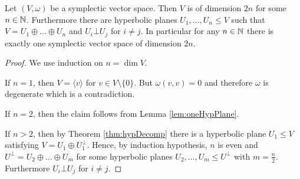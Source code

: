 \begin{corollary}\label{cor:structureSympl}
				
	Let $(V,\omega)$ be a symplectic vector space. Then $V$ is of dimension $2n$ for some $n\in\mathbb{N}$. Furthermore there are hyperbolic planes $U_1,\dots, U_n\leq V$ such that $V=U_1\oplus\dots\oplus U_n$ and $U_i\bot U_j$ for $i\not=j$.
	In particular for any $n\in\mathbb{N}$ there is exactly one symplectic vector space of dimension $2n$.
\end{corollary}
\begin{proof}
	We use induction on $n=\dim V$.
				
	If $n=1$, then $V=\langle v\rangle$ for $v\in V\setminus\{0\}$. But $\omega(v,v)=0$ and therefore $\omega$ is degenerate which is a contradiction.
				
	If $n=2$, then the claim follows from Lemma \ref{lem:oneHypPlane}.
				
	If $n>2$, then by Theorem \ref{thm:hypDecomp} there is a hyperbolic plane $U_1\leq V$ satisfying $V=U_1\oplus U_1^\bot$. Hence, by induction hypothesis, $n$ is even and $U^\bot =U_2\oplus\dots \oplus U_m$ for some hyperbolic planes $U_2,\dots,U_m\leq U^\bot$ with $m=\frac{n}{2}$. Furthermore $U_i\bot U_j$ for $i\not=j$.
\end{proof}
		
